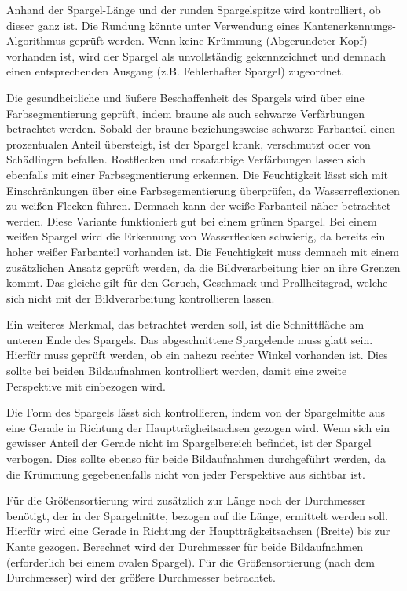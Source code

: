 \documentclass{ezb}
\begin{document}
Anhand der Spargel-Länge und der runden Spargelspitze wird kontrolliert, ob dieser ganz ist. Die Rundung könnte unter Verwendung eines Kantenerkennungs-Algorithmus geprüft werden. Wenn keine Krümmung (Abgerundeter Kopf) vorhanden ist, wird der Spargel als unvollständig gekennzeichnet und demnach einen entsprechenden Ausgang (z.B. \glqq Fehlerhafter Spargel\grqq) zugeordnet.

Die gesundheitliche und äußere Beschaffenheit des Spargels wird über eine Farbsegmentierung geprüft, indem braune als auch schwarze Verfärbungen betrachtet werden. Sobald der braune beziehungsweise schwarze Farbanteil einen prozentualen Anteil übersteigt, ist der Spargel krank, verschmutzt oder von Schädlingen befallen. Rostflecken und rosafarbige Verfärbungen lassen sich ebenfalls mit einer Farbsegmentierung erkennen.
Die Feuchtigkeit lässt sich mit Einschränkungen über eine Farbsegementierung überprüfen, da Wasserreflexionen zu weißen Flecken führen. Demnach kann der weiße Farbanteil näher betrachtet werden. Diese Variante funktioniert gut bei einem grünen Spargel. Bei einem weißen Spargel wird die Erkennung von Wasserflecken schwierig, da bereits ein hoher weißer Farbanteil vorhanden ist. Die Feuchtigkeit muss demnach mit einem zusätzlichen Ansatz geprüft werden, da die Bildverarbeitung hier an ihre Grenzen kommt. Das gleiche gilt für den Geruch, Geschmack und Prallheitsgrad, welche sich nicht mit der Bildverarbeitung kontrollieren lassen.

Ein weiteres Merkmal, das betrachtet werden soll, ist die Schnittfläche am unteren Ende des Spargels. Das abgeschnittene Spargelende muss glatt sein. Hierfür muss geprüft werden, ob ein nahezu rechter Winkel vorhanden ist. Dies sollte bei beiden Bildaufnahmen kontrolliert werden, damit eine zweite Perspektive mit einbezogen wird. 

Die Form des Spargels lässt sich kontrollieren, indem von der Spargelmitte aus eine Gerade in Richtung der Hauptträgheitsachsen gezogen wird. Wenn sich ein gewisser Anteil der Gerade nicht im Spargelbereich befindet, ist der Spargel verbogen. Dies sollte ebenso für beide Bildaufnahmen durchgeführt werden, da die Krümmung gegebenenfalls nicht von jeder Perspektive aus sichtbar ist.

Für die Größensortierung wird zusätzlich zur Länge noch der Durchmesser benötigt, der in der Spargelmitte, bezogen auf die Länge, ermittelt werden soll. Hierfür wird eine Gerade in Richtung der Hauptträgkeitsachsen (Breite) bis zur Kante gezogen. Berechnet wird der Durchmesser für beide Bildaufnahmen (erforderlich bei einem ovalen Spargel). Für die Größensortierung (nach dem Durchmesser) wird der größere Durchmesser betrachtet.
\end{document}
